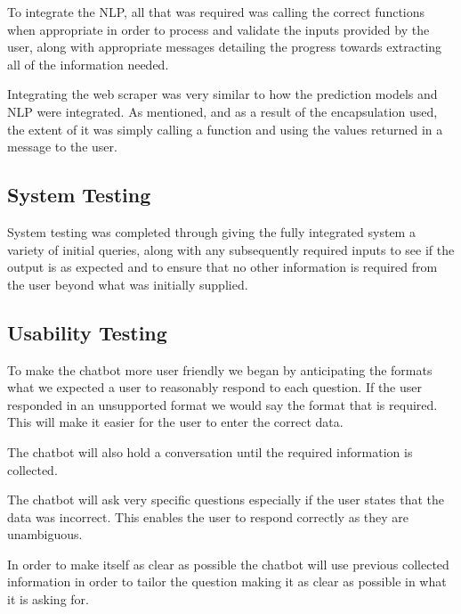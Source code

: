 \documentclass[11pt]{article}
\begin{document}
	To integrate the NLP, all that was required was calling the correct functions when appropriate in order to process and validate the inputs provided by the user, along with appropriate messages detailing the progress towards extracting all of the information needed.
	
	Integrating the web scraper was very similar to how the prediction models and NLP were integrated. As mentioned, and as a result of the encapsulation used, the extent of it was simply calling a function and using the values returned in a message to the user.
	
	\subsection{System Testing}
	
	System testing was completed through giving the fully integrated system a variety of initial queries, along with any subsequently required inputs to see if the output is as expected and to ensure that no other information is required from the user beyond what was initially supplied.
	
	\subsection{Usability Testing}
	
	To make the chatbot more user friendly we began by anticipating the formats what we expected a user to reasonably respond to each question. If the user responded in an unsupported format we would say the format that is required. This will make it easier for the user to enter the correct data.
	
	The chatbot will also hold a conversation until the required information is collected. 
	
	The chatbot will ask very specific questions especially if the user states that the data was incorrect. This enables the user to respond correctly as they are unambiguous.
	
	In order to make itself as clear as possible the chatbot will use previous collected information in order to tailor the question making it as clear as possible in what it is asking for. 
	
\end{document}
